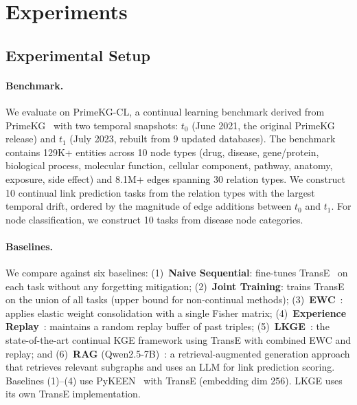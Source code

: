 \section{Experiments}
\label{sec:experiments}

\subsection{Experimental Setup}
\label{subsec:setup}

\paragraph{Benchmark.}
We evaluate on PrimeKG-CL, a continual learning benchmark derived from PrimeKG~\citep{chandak2023building} with two temporal snapshots: $t_0$ (June 2021, the original PrimeKG release) and $t_1$ (July 2023, rebuilt from 9 updated databases).
The benchmark contains 129K+ entities across 10 node types (drug, disease, gene/protein, biological process, molecular function, cellular component, pathway, anatomy, exposure, side effect) and 8.1M+ edges spanning 30 relation types.
We construct 10 continual link prediction tasks from the relation types with the largest temporal drift, ordered by the magnitude of edge additions between $t_0$ and $t_1$.
For node classification, we construct 10 tasks from disease node categories.

\paragraph{Baselines.}
We compare against six baselines:
(1)~\textbf{Naive Sequential}: fine-tunes TransE~\citep{bordes2013translating} on each task without any forgetting mitigation;
(2)~\textbf{Joint Training}: trains TransE on the union of all tasks (upper bound for non-continual methods);
(3)~\textbf{EWC}~\citep{kirkpatrick2017overcoming}: applies elastic weight consolidation with a single Fisher matrix;
(4)~\textbf{Experience Replay}~\citep{rolnick2019experience}: maintains a random replay buffer of past triples;
(5)~\textbf{LKGE}~\citep{cui2023lifelong}: the state-of-the-art continual KGE framework using TransE with combined EWC and replay; and
(6)~\textbf{RAG} (Qwen2.5-7B)~\citep{lewis2020retrieval}: a retrieval-augmented generation approach that retrieves relevant subgraphs and uses an LLM for link prediction scoring.
Baselines (1)--(4) use PyKEEN~\citep{ali2021pykeen} with TransE (embedding dim 256).
LKGE uses its own TransE implementation.

